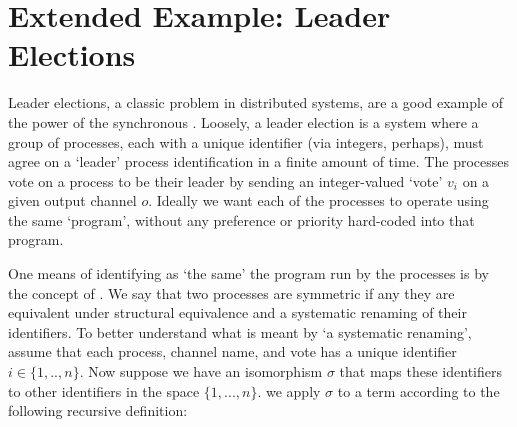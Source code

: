 \section{Extended Example: Leader Elections}
Leader elections, a classic problem in distributed systems, are a good example of the power of the synchronous \picalc.
Loosely, a leader election is a system where a group of processes, each with a unique identifier (via integers, perhaps), must agree on a `leader' process identification in a finite amount of time.
The processes vote on a process to be their leader by sending an integer-valued `vote' $v_i$ on a given output channel $o$.  
Ideally we want each of the processes to operate using the same `program', without any preference or priority hard-coded into that program.

One means of identifying as `the same' the program run by the processes is by the concept of .
We say that two processes are symmetric if any they are equivalent under structural equivalence and a systematic renaming of their identifiers.
To better understand what is meant by `a systematic renaming', assume that each process, channel name, and vote has a unique identifier $i \in \{1,..,n\}$.
Now suppose we have an isomorphism $\sigma$ that maps these identifiers to other identifiers in the space $\{1,...,n\}$.
we apply $\sigma$ to a term according to the following recursive definition:
